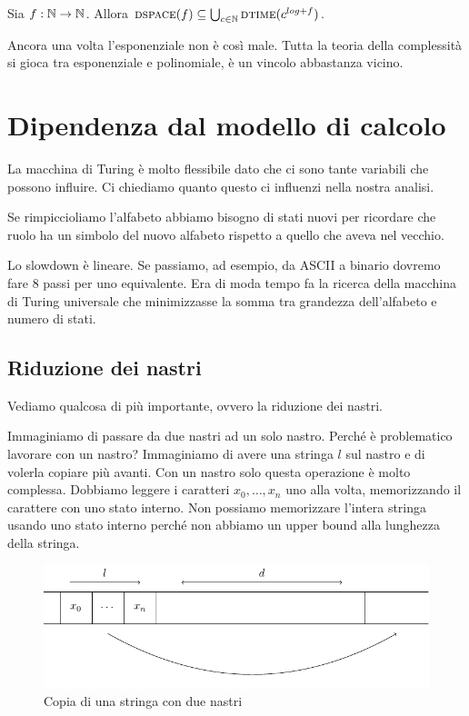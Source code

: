 \begin{thm}
    Sia $f: \mathbb{N} \to \mathbb{N}$. Allora $\textsc{dspace}(f) \subseteq \bigcup_{c \in \mathbb{N}}\textsc{dtime}(c^{log + f})$.
\end{thm}

Ancora una volta l'esponenziale non è così male. Tutta la teoria della complessità si gioca tra
esponenziale e polinomiale, è un vincolo abbastanza vicino.

\section{Dipendenza dal modello di calcolo}

La macchina di Turing è molto flessibile dato che ci sono tante variabili che possono influire. Ci
chiediamo quanto questo ci influenzi nella nostra analisi.

Se rimpiccioliamo l'alfabeto abbiamo bisogno di stati nuovi per ricordare che ruolo ha un simbolo del
nuovo alfabeto rispetto a quello che aveva nel vecchio.

Lo slowdown è lineare. Se passiamo, ad esempio, da ASCII a binario dovremo fare 8 passi per uno
equivalente. Era di moda tempo fa la ricerca della macchina di Turing universale che minimizzasse la
somma tra grandezza dell'alfabeto e numero di stati.


\subsection{Riduzione dei nastri}

Vediamo qualcosa di più importante, ovvero la riduzione dei nastri.

Immaginiamo di passare da due nastri ad un solo nastro. Perché è problematico lavorare con un
nastro? Immaginiamo di avere una stringa $l$ sul nastro e di volerla copiare più avanti. Con un
nastro solo questa operazione è molto complessa. Dobbiamo leggere i caratteri $x_{0},\dotsc,x_{n}$
uno alla volta, memorizzando il carattere con uno stato interno. Non possiamo memorizzare l'intera
stringa usando uno stato interno perché non abbiamo un upper bound alla lunghezza della stringa.

\begin{figure}[h]
    \begin{center}
        \includegraphics{img/CopyString.pdf}
        \caption{Copia di una stringa con due nastri}
    \end{center}
\end{figure}

